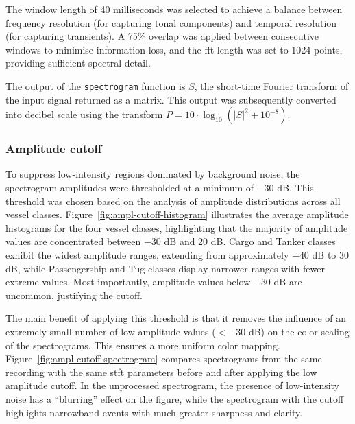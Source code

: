 The window length of 40 milliseconds was selected to achieve a balance between frequency resolution (for capturing tonal components) and temporal resolution (for capturing transients). A 75\% overlap was applied between consecutive windows to minimise information loss, and the \acrshort{fft} length was set to 1024 points, providing sufficient spectral detail.

The output of the \texttt{spectrogram} function is $S$, the short-time Fourier transform of the input signal returned as a matrix. This output was subsequently converted into decibel scale using the transform $P = 10 \cdot \log_{10}(|S|^2 + 10^{-8})$.

\subsubsection{Amplitude cutoff}

To suppress low-intensity regions dominated by background noise, the spectrogram amplitudes were thresholded at a minimum of $-30$ dB. This threshold was chosen based on the analysis of amplitude distributions across all vessel classes. Figure~\ref{fig:ampl-cutoff-histogram} illustrates the average amplitude histograms for the four vessel classes, highlighting that the majority of amplitude values are concentrated between $-30$ dB and 20 dB. Cargo and Tanker classes exhibit the widest amplitude ranges, extending from approximately $-40$ dB to 30 dB, while Passengership and Tug classes display narrower ranges with fewer extreme values. Most importantly, amplitude values below $-30$ dB are uncommon, justifying the cutoff.

The main benefit of applying this threshold is that it removes the influence of an extremely small number of low-amplitude values ($<-30$ dB) on the color scaling of the spectrograms. This ensures a more uniform color mapping. Figure~\ref{fig:ampl-cutoff-spectrogram} compares spectrograms from the same recording with the same \acrshort{stft} parameters before and after applying the low amplitude cutoff. In the unprocessed spectrogram, the presence of low-intensity noise has a ``blurring'' effect on the figure, while the spectrogram with the cutoff highlights narrowband events with much greater sharpness and clarity.

